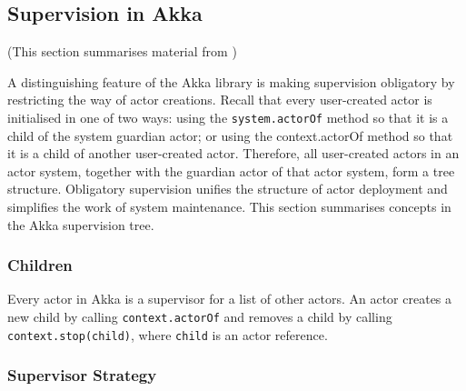 
\subsection{Supervision in Akka}
\label{akka_supervision}
(This section summarises material from \citep[Section 2.4 and 3.4]{akka_doc})
\vspace{12 pt}

A distinguishing feature of the Akka library is making supervision obligatory 
by restricting the way of actor creations. Recall that every user-created actor 
is initialised in one of two ways: using the {\tt system.actorOf} method so that
it is a child of the system guardian actor; or using the {context.actorOf} method
so that it is a child of another user-created actor.  Therefore, all 
user-created actors in an actor system, together with the guardian actor of 
that actor system, form a tree structure. Obligatory supervision unifies the 
structure of actor deployment and simplifies the work of system maintenance.  
This section summarises concepts in the Akka supervision tree.


\subsubsection{Children}

Every actor in Akka is a supervisor for a list of other actors.  An actor 
creates a new child by calling {\tt context.actorOf} and removes a child 
by calling {\tt context.stop(child)}, where {\tt child} is an actor reference.

\begin{comment}
\begin{lstlisting}[language=scala]

val system = ActorSystem("mysystem")
val actor = system.acotOf(Props[MyActor], "myactor")


\end{lstlisting}

\begin{lstlisting}[language=scala]
class MyActor extends Actor {
  val child = context.actorOf(Props[Child], "mychild")
  // recieve etc.
}
\end{lstlisting}

\end{comment}

\subsubsection{Supervisor Strategy}

